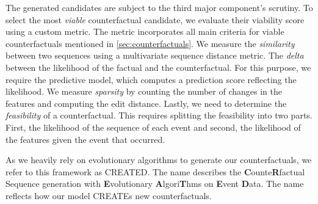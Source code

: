 \documentclass[./../../paper.tex]{subfiles}
\begin{document}
The generated candidates are subject to the third major component's scrutiny. 
To select the most \emph{viable} counterfactual candidate, we evaluate their viability score using a custom metric. 
The metric incorporates all main criteria for viable counterfactuals mentioned in \autoref{sec:counterfactuals}. 
We measure the \emph{similarity} between two sequences using a multivariate sequence distance metric. The \emph{delta} between the likelihood of the factual and the counterfactual. For this purpose, we require the predictive model, which computes a prediction score reflecting the likelihood. 
We measure \emph{sparsity} by counting the number of changes in the features and computing the edit distance. Lastly, we need to determine the \emph{feasibility} of a counterfactual. This requires splitting the feasibility into two parts. First, the likelihood of the sequence of each event and second, the likelihood of the features given the event that occurred.

As we heavily rely on evolutionary algorithms to generate our counterfactuals, we refer to this framework as CREATED. The name describes the \textbf{C}ounte\textbf{R}factual Sequence generation with \textbf{E}volutionary \textbf{A}lgori\textbf{T}hms on \textbf{E}vent \textbf{D}ata. The name reflects how our model CREATEs new counterfactuals.
\end{document}
